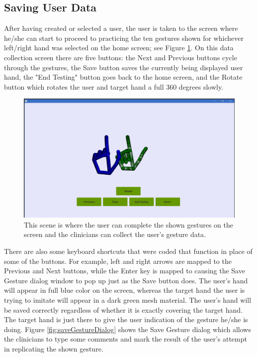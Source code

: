 \subsection{Saving User Data}
After having created or selected a user, the user is taken to the screen where he/she can start to proceed to practicing the ten gestures shown for whichever left/right hand was selected on the home screen; see Figure \ref{fig:dataCollectionScene}. On this data collection screen there are five buttons: the Next and Previous buttons cycle through the gestures, the Save button saves the currently being displayed user hand, the "End Testing" button goes back to the home screen, and the Rotate button which rotates the user and target hand a full 360 degrees slowly.
\begin{figure}[H]
\centering
\includegraphics[scale=0.35]{Figures/6_userTargetHand.JPG}
\caption[Data Collection Scene]{This scene is where the user can complete the shown gestures on the screen and the clinicians can collect the user's gesture data.}
\label{fig:dataCollectionScene}
\end{figure}
There are also some keyboard shortcuts that were coded that function in place of some of the buttons. For example, left and right arrows are mapped to the Previous and Next buttons, while the Enter key is mapped to causing the Save Gesture dialog window to pop up just as the Save button does. The user's hand will appear in full blue color on the screen, whereas the target hand the user is trying to imitate will appear in a dark green mesh material. The user's hand will be saved correctly regardless of whether it is exactly covering the target hand. The target hand is just there to give the user indication of the gesture he/she is doing. Figure \ref{fig:saveGestureDialog} shows the Save Gesture dialog which allows the clinicians to type some comments and mark the result of the user's attempt in replicating the shown gesture. 
